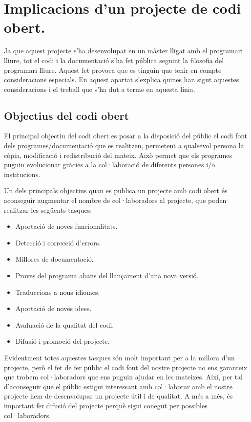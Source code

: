 \chapter{Implicacions d'un projecte de codi obert.}
\label{chap:codi_obert}

Ja que aquest projecte s'ha desenvolupat en un màster lligat amb el programari lliure, tot el codi i la documentació s'ha fet pública seguint la filosofia del programari lliure. Aquest fet provoca que es tinguin que tenir en compte consideracions especials. En aquest apartat s'explica quines han sigut aquestes consideracions i el treball que s'ha dut a terme en aquesta línia. 

\section{Objectius del codi obert}

El principal objectiu del codi obert es posar a la disposició del públic el codi font dels programes/documentació que es realitzen, permetent a qualsevol persona la còpia, modificació i redistribució del mateix. Això permet que els programes puguin evolucionar gràcies a la col·laboració de diferents persones i/o institucions.

Un dels principals objectius quan es publica un projecte amb codi obert és aconseguir augmentar el nombre de col·laboradors al projecte, que poden realitzar les següents tasques:

\begin{itemize}
\item{Aportació de noves funcionalitats.}
\item{Detecció i correcció d'errors.}
\item{Millores de documentació.}
\item{Proves del programa abans del llançament d'una nova versió.}
\item{Traduccions a nous idiomes.}
\item{Aportació de noves idees.}
\item{Avaluació de la qualitat del codi.}
\item{Difusió i promoció del projecte.}
\end{itemize}

Evidentment totes aquestes tasques són molt important per a la millora d'un projecte, però el fet de fer públic el codi font del nostre projecte no ens garanteix que trobem col·laboradors que ens puguin ajudar en les mateixes. Així, per tal d'aconseguir que el públic estigui interessant amb col·laborar amb el nostre projecte hem de desenvolupar un projecte útil i de qualitat. A més a més, és important fer difusió del projecte perquè sigui conegut per possibles col·laboradors.  

